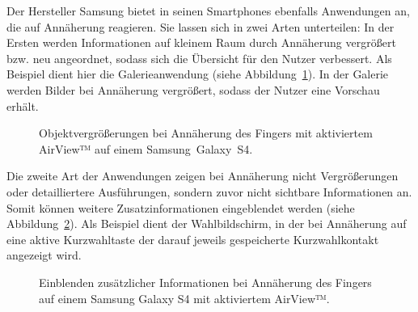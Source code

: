 \documentclass[12pt,numbers=noenddot,parskip,bibliography=totocnumbered,listof=totocnumbered]{scrreprt}
\begin{document}
Der Hersteller Samsung bietet in seinen Smartphones ebenfalls Anwendungen an, die auf Annäherung reagieren. Sie lassen sich in zwei Arten unterteilen: In der Ersten werden Informationen auf kleinem Raum durch Annäherung vergrößert bzw. neu angeordnet, sodass sich die Übersicht für den Nutzer verbessert. Als Beispiel dient hier die Galerieanwendung (siehe Abbildung~\ref{samsungeinleitung1}). In der Galerie werden Bilder bei Annäherung vergrößert, sodass der Nutzer eine Vorschau erhält.
\begin{figure}
\centering
{}
\hfill
{}
\caption{Objektvergrößerungen bei Annäherung des Fingers mit aktiviertem \mbox{AirView™} auf einem \mbox{Samsung Galaxy S4}.}
\label{samsungeinleitung1}
\end{figure}
Die zweite Art der Anwendungen zeigen bei Annäherung nicht Vergrößerungen oder detailliertere Ausführungen, sondern zuvor nicht sichtbare Informationen an. Somit können weitere Zusatzinformationen eingeblendet werden (siehe Abbildung~\ref{samsungeinleitung2}). Als Beispiel dient der Wahlbildschirm, in der bei Annäherung auf eine aktive Kurzwahltaste der darauf jeweils gespeicherte Kurzwahlkontakt angezeigt wird.
\begin{figure}
\centering
{}
\hfill
{}
\caption{Einblenden zusätzlicher Informationen bei Annäherung des Fingers auf einem Samsung Galaxy S4 mit aktiviertem \mbox{AirView™.}}
\label{samsungeinleitung2}
\end{figure}
\end{document}
